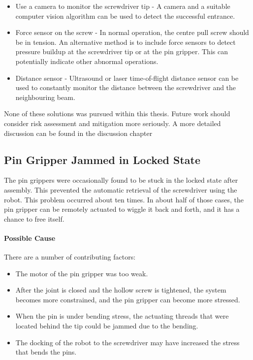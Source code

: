 \begin{itemize}
    \item Use a camera to monitor the screwdriver tip - A camera and a suitable computer vision algorithm can be used to detect the successful entrance.
    \item Force sensor on the screw - In normal operation, the centre pull screw should be in tension. An alternative method is to include force sensors to detect pressure buildup at the screwdriver tip or at the pin gripper. This can potentially indicate other abnormal operations.
    \item Distance sensor - Ultrasound or laser time-of-flight distance sensor can be used to constantly monitor the distance between the screwdriver and the neighbouring beam.

\end{itemize}
None of these solutions was pursued within this thesis. Future work should consider risk assessment and mitigation more seriously. A more detailed discussion can be found in the discussion chapter 

\subsection{Pin Gripper Jammed in Locked State}
\label{subsection:exploration-4-pin-gripper-jammed-in-locked-state}

The pin grippers were occasionally found to be stuck in the locked state after assembly. This prevented the automatic retrieval of the screwdriver using the robot. This problem occurred about ten times. In about half of those cases, the pin gripper can be remotely actuated to wiggle it back and forth, and it has a chance to free itself.

\paragraph{Possible Cause}
There are a number of contributing factors:
\begin{itemize}
    \item The motor of the pin gripper was too weak.
    \item After the joint is closed and the hollow screw is tightened, the system becomes more constrained, and the pin gripper can become more stressed.
    \item When the pin is under bending stress, the actuating threads that were located behind the tip could be jammed due to the bending.
    \item The docking of the robot to the screwdriver may have increased the stress that bends the pins.
\end{itemize}

